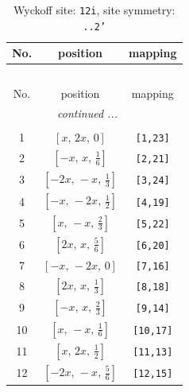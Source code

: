 \documentclass[fleqn,8pt]{jsarticle}
\begin{document}
\begin{longtable}{ccc}
\caption{Wyckoff site: {\tt 12i}, site symmetry: {\tt ..2'}}
 \\
 \hline \hline
No. & position & mapping \\ \hline \endfirsthead

\multicolumn{2}{l}{\tablename\ \thetable{}} \\
 \hline \hline
No. & position & mapping \\ \hline \endhead

 \hline \hline
\multicolumn{2}{r}{\footnotesize\it continued ...} \\ \endfoot

 \hline \hline
\multicolumn{2}{r}{} \\ \endlastfoot

1 & $\left[ x,\, 2 x,\, 0 \right]$ & {\tt [1,23]} \\ \hline
2 & $\left[ - x,\, x,\, \frac{1}{6} \right]$ & {\tt [2,21]} \\ \hline
3 & $\left[ - 2 x,\, - x,\, \frac{1}{3} \right]$ & {\tt [3,24]} \\ \hline
4 & $\left[ - x,\, - 2 x,\, \frac{1}{2} \right]$ & {\tt [4,19]} \\ \hline
5 & $\left[ x,\, - x,\, \frac{2}{3} \right]$ & {\tt [5,22]} \\ \hline
6 & $\left[ 2 x,\, x,\, \frac{5}{6} \right]$ & {\tt [6,20]} \\ \hline
7 & $\left[ - x,\, - 2 x,\, 0 \right]$ & {\tt [7,16]} \\ \hline
8 & $\left[ 2 x,\, x,\, \frac{1}{3} \right]$ & {\tt [8,18]} \\ \hline
9 & $\left[ - x,\, x,\, \frac{2}{3} \right]$ & {\tt [9,14]} \\ \hline
10 & $\left[ x,\, - x,\, \frac{1}{6} \right]$ & {\tt [10,17]} \\ \hline
11 & $\left[ x,\, 2 x,\, \frac{1}{2} \right]$ & {\tt [11,13]} \\ \hline
12 & $\left[ - 2 x,\, - x,\, \frac{5}{6} \right]$ & {\tt [12,15]} \\
\end{longtable}
\renewcommand{\arraystretch}{1.2}
\end{document}
